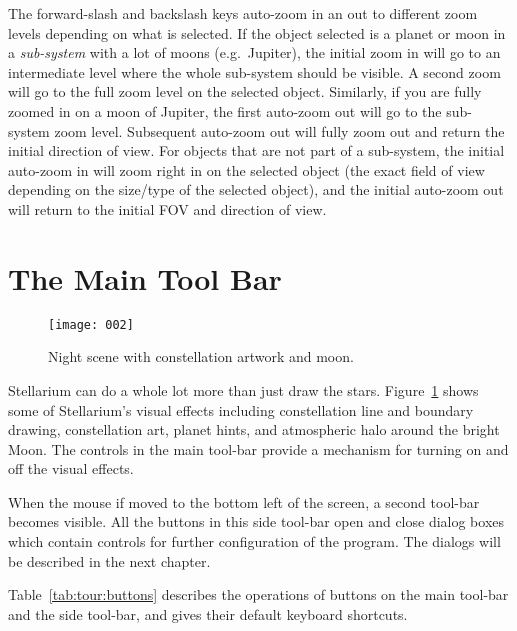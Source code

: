 The forward-slash \key{/} and backslash \key{\textbackslash} keys auto-zoom in an out to different
zoom levels depending on what is selected. If the object selected is a planet
or moon in a \emph{sub-system} with a lot of moons (e.g.\ Jupiter), the
initial zoom in will go to an intermediate level where the whole
sub-system should be visible. A second zoom will go to the full zoom
level on the selected object. Similarly, if you are fully zoomed in on a
moon of Jupiter, the first auto-zoom out will go to the sub-system zoom
level. Subsequent auto-zoom out will fully zoom out and return the
initial direction of view. For objects that are not part of a
sub-system, the initial auto-zoom in will zoom right in on the selected
object (the exact field of view depending on the size/type of the
selected object), and the initial auto-zoom out will return to the
initial FOV and direction of view.

\section{The Main Tool Bar}
\label{sec:tour:toolbar}

\begin{figure}[htb]
\centering\texttt{[image: 002]}
\caption{Night scene with constellation artwork and moon.}
\label{fig:002}
\end{figure}

Stellarium can do a whole lot more than just draw the stars. Figure~\ref{fig:002}
shows some of Stellarium's visual effects including constellation
line and boundary drawing, constellation art, planet hints, and
atmospheric halo around the bright Moon. The controls in the main tool-bar
provide a mechanism for turning on and off the visual effects.

When the mouse if moved to the bottom left of the screen, a second
tool-bar becomes visible. All the buttons in this side tool-bar open
and close dialog boxes which contain controls for further
configuration of the program. The dialogs will be described in the
next chapter.


Table~\ref{tab:tour:buttons} describes the operations of buttons
on the main tool-bar and the side tool-bar, and gives their default
keyboard shortcuts.


